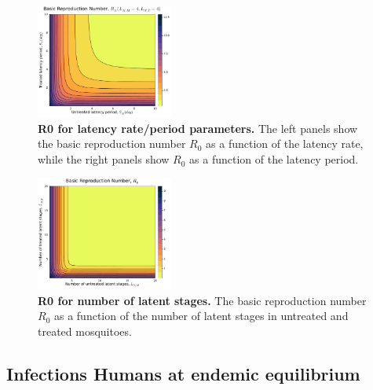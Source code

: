 \documentclass[12pt]{article}
\begin{document}
\begin{figure}[H]
    \includegraphics[width=0.4\textwidth]{../../fig/gen_model/R0_periods_SMxST_4x4.pdf}
    \caption{\textbf{R0 for latency rate/period parameters.} The left panels show the basic reproduction number \(R_0\) as a function of the latency rate, while the right panels show \(R_0\) as a function of the latency period.}
\end{figure}

\begin{figure}[H]
    \centering
    \includegraphics[width=0.4\textwidth]{../../fig/gen_model/R0_NLMxNLT.pdf}
    \caption{\textbf{R0 for number of latent stages.} The basic reproduction number \(R_0\) as a function of the number of latent stages in untreated and treated mosquitoes.}
\end{figure}

\subsection{Infections Humans at endemic equilibrium}
\end{document}
